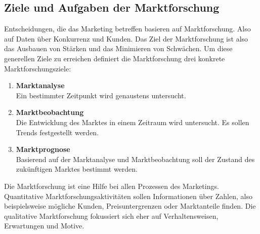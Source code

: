 \subsection{Ziele und Aufgaben der Marktforschung}
\begin{flushleft}
    Entscheidungen, die das Marketing betreffen basieren auf Marktforschung. Also auf Daten über Konkurrenz und Kunden.
    Das Ziel der Marktforschung ist also das Ausbauen von Stärken und das Minimieren von Schwächen.
    Um diese generellen Ziele zu erreichen definiert die Marktforschung drei konkrete Marktforschungsziele:
    \begin{enumerate}
        \item {
            \textbf{Marktanalyse} \\
            Ein bestimmter Zeitpunkt wird genaustens untersucht.
        }
        \item {
            \textbf{Marktbeobachtung} \\
            Die Entwicklung des Marktes in einem Zeitraum wird untersucht.
            Es sollen Trends festgestellt werden.
        }
        \item {
            \textbf{Marktprognose} \\
            Basierend auf der Marktanalyse und Marktbeobachtung soll der Zustand des zukünftigen Marktes bestimmt werden.
        }
    \end{enumerate}
    Die Marktforschung ist eine Hilfe bei allen Prozessen des Marketings.
    Quantitative Marktforschungsaktivitäten sollen Informationen über Zahlen, also beispielsweise mögliche Kunden, Preisuntergrenzen oder Marktanteile finden.
    Die qualitative Marktforschung fokussiert sich eher auf Verhaltensweisen, Erwartungen und Motive.
\end{flushleft}

